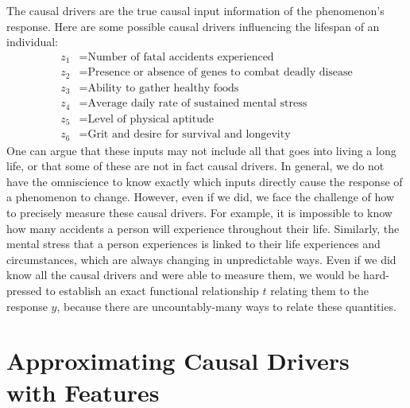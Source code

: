 \documentclass[12pt]{article}
\begin{document}
	The causal drivers are the true causal input information of the phenomenon's response.
	Here are some possible causal drivers influencing the lifespan of an individual:
	\begin{align*}
		z_1 &= \text{Number of fatal accidents experienced}\\
		z_2 &= \text{Presence or absence of genes to combat deadly disease}\\
		z_3 &= \text{Ability to gather healthy foods}\\
		z_4 &= \text{Average daily rate of sustained mental stress}\\
		z_5 &= \text{Level of physical aptitude}\\
		z_6 &= \text{Grit and desire for survival and longevity}
	\end{align*}
	One can argue that these inputs may not include all that goes into living
	a long life, or that some of these are not in fact causal drivers. In general,
	we do not have the omniscience to know exactly which inputs directly cause the
	response of a phenomenon to change. However, even if we did, we face the challenge
	of how to precisely measure these causal drivers. For example, it is impossible
	to know how many accidents a person will experience throughout their life.
	Similarly, the mental stress that a person experiences is linked to their
	life experiences and circumstances, which are always changing in unpredictable ways.
	Even if we did know all the causal drivers and were able to measure them,
	we would be hard-pressed to establish an exact functional relationship $t$
	relating them to the response $y$, because there are uncountably-many
	ways to relate these quantities.
	
	\section{Approximating Causal Drivers with Features}
	
\end{document}
